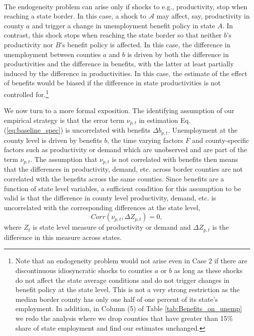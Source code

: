 \documentclass[12pt]{article}
\newcommand{\1}{\mathbf{1}}
\begin{document}
\vspace{0.3cm} \\ The endogeneity problem can arise only if shocks to e.g., productivity, stop when reaching a state border. In this case, a shock to $\mathcal{A}$ may affect, say, productivity in county $a$ and trigger a change in unemployment benefit policy in state $A$. In contrast, this shock stops when reaching the state border so that neither $b$'s productivity nor $B$'s benefit policy is affected. In this case, the difference in unemployment between counties $a$ and $b$ is driven by both the difference in productivities and the difference in benefits, with the latter at least partially induced by the difference in productivities. In this case, the estimate of the effect of benefits would be biased if the difference in state productivities is not controlled for.\footnote{Note that an endogeneity problem would not arise even in Case 2 if there are discontinuous idiosyncratic shocks to counties $a$ or $b$ as long as these shocks do not affect the state average conditions and do not trigger changes in benefit policy at the state level. This is not a very strong restriction as the median border county has only one half of one percent of its state's employment. In addition, in Column (5) of Table \ref{tab:Benefits_on_unemp} we redo the analysis where we drop counties that have greater than 15\% share of state employment and find our estimates unchanged.}

\vspace{0.4cm} We now turn to a more formal exposition. The identifying assumption of our empirical strategy is that the error term $\nu_{p,t}$ in estimation Eq. (\ref{eq:baseline_spec}) is uncorrelated with benefits $\Delta b_{p,t}$. Unemployment at the county level is driven by benefits $b$, the time varying factors $F$ and county-specific factors such as productivity or demand which are unobserved and are part of the term $\nu_{p,t}$. The assumption that $\nu_{p,t}$ is not correlated with benefits then means that the differences in productivity, demand, etc. across border counties are not correlated with the benefits across the same counties. Since benefits are a function of state level variables, a sufficient condition for this assumption to be valid is that the difference in county level productivity, demand, etc. is uncorrelated with the corresponding differences at the state level,
\begin{equation} \label{assu:identify}
Corr (\nu_{p,t}, \Delta Z_{p,t}) = 0,
\end{equation}
where $Z_{t}$ is state level measure of productivity or demand and $\Delta Z_{p,t}$ is the difference in this measure across states. 
\end{document}
